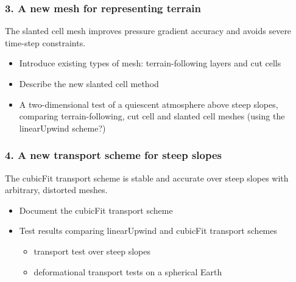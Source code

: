 \documentclass[a4paper,11pt]{article}
\begin{document}
\subsubsection*{3. A new mesh for representing terrain}
\noindent The slanted cell mesh improves pressure gradient accuracy and avoids severe time-step constraints.
\begin{itemize}[itemsep=0.1em]
	\item Introduce existing types of mesh: terrain-following layers and cut cells
	\item Describe the new slanted cell method
	\item A two-dimensional test of a quiescent atmosphere above steep slopes, comparing terrain-following, cut cell and slanted cell meshes (using the linearUpwind scheme?)
\end{itemize}

\subsubsection*{4. A new transport scheme for steep slopes}
\noindent The cubicFit transport scheme is stable and accurate over steep slopes with arbitrary, distorted meshes.
\begin{itemize}[itemsep=0.1em]
	\item Document the cubicFit transport scheme
	\item {Test results comparing linearUpwind and cubicFit transport schemes
	\begin{itemize}[itemsep=0.1em,topsep=0pt]
		\item \citet{shaw2017} transport test over steep slopes 
		\item \citet{lauritzen2012} deformational transport tests on a spherical Earth
	\end{itemize}}
\end{itemize}
\end{document}
